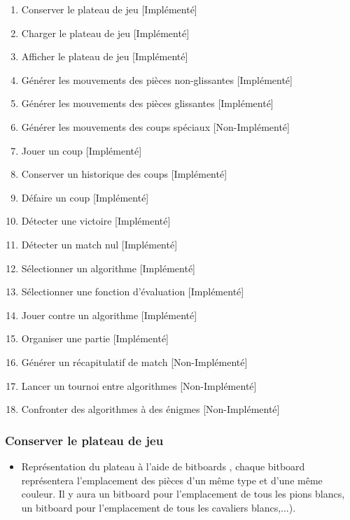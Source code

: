\huge\documentclass{article}
\begin{document}
    \begin{enumerate}
        \item Conserver le plateau de jeu \hfill[Implémenté]
        \medskip
        \item Charger le plateau de jeu \hfill[Implémenté]
        \medskip
        \item Afficher le plateau de jeu \hfill[Implémenté]
        \medskip
        \item Générer les mouvements des pièces non-glissantes \hfill[Implémenté]
        \medskip
        \item Générer les mouvements des pièces glissantes \hfill[Implémenté]
        \medskip
        \item Générer les mouvements des coups spéciaux \hfill[Non-Implémenté]
        \medskip
        \item Jouer un coup \hfill[Implémenté]
        \medskip
        \item Conserver un historique des coups \hfill[Implémenté]
        \medskip
        \item Défaire un coup \hfill[Implémenté]
        \medskip
        \item Détecter une victoire \hfill[Implémenté]
        \medskip
        \item Détecter un match nul \hfill[Implémenté]
        \medskip
        \item Sélectionner un algorithme \hfill[Implémenté]
        \medskip
        \item Sélectionner une fonction d'évaluation \hfill[Implémenté]
        \medskip
        \item Jouer contre un algorithme \hfill[Implémenté]
        \medskip
        \item Organiser une partie \hfill[Implémenté]
        \medskip
        \item Générer un récapitulatif de match \hfill[Non-Implémenté]
        \medskip
        \item Lancer un tournoi entre algorithmes \hfill[Non-Implémenté]
        \medskip
        \item Confronter des algorithmes à des énigmes \hfill[Non-Implémenté]
        \medskip
    \end{enumerate}

    \subsubsection{Conserver le plateau de jeu}
    \medskip
    \begin{itemize}
        \item Représentation du plateau à l'aide de bitboards \cite{Bitboards}, chaque bitboard représentera l'emplacement des pièces d'un même type et d'une même couleur. Il y aura un bitboard pour l'emplacement de tous les pions blancs, un bitboard pour l'emplacement de tous les cavaliers blancs,...).
    \end{itemize}
    \medskip
\end{document}
